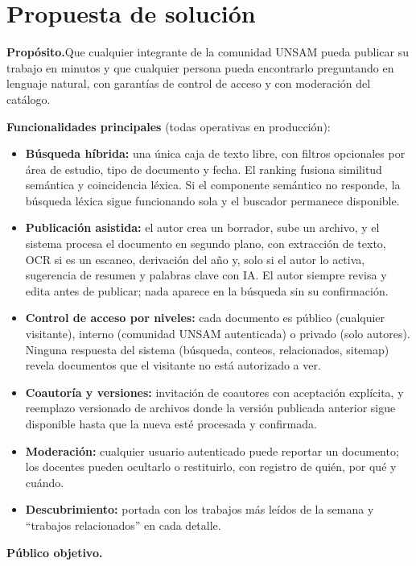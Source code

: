 \documentclass[12pt,a4paper]{article}
\begin{document}
\section{Propuesta de solución}

\noindent\textbf{Propósito.}\enspace Que cualquier integrante de la comunidad UNSAM pueda publicar su trabajo en minutos y que cualquier persona pueda encontrarlo preguntando en lenguaje natural, con garantías de control de acceso y con moderación del catálogo.

\medskip
\noindent\textbf{Funcionalidades principales} (todas operativas en producción):

\begin{itemize}
  \item \textbf{Búsqueda híbrida:} una única caja de texto libre, con filtros opcionales por área de estudio, tipo de documento y fecha. El ranking fusiona similitud semántica y coincidencia léxica. Si el componente semántico no responde, la búsqueda léxica sigue funcionando sola y el buscador permanece disponible.
  \item \textbf{Publicación asistida:} el autor crea un borrador, sube un archivo, y el sistema procesa el documento en segundo plano, con extracción de texto, OCR si es un escaneo, derivación del año y, solo si el autor lo activa, sugerencia de resumen y palabras clave con IA. El autor siempre revisa y edita antes de publicar; nada aparece en la búsqueda sin su confirmación.
  \item \textbf{Control de acceso por niveles:} cada documento es público (cualquier visitante), interno (comunidad UNSAM autenticada) o privado (solo autores). Ninguna respuesta del sistema (búsqueda, conteos, relacionados, sitemap) revela documentos que el visitante no está autorizado a ver.
  \item \textbf{Coautoría y versiones:} invitación de coautores con aceptación explícita, y reemplazo versionado de archivos donde la versión publicada anterior sigue disponible hasta que la nueva esté procesada y confirmada.
  \item \textbf{Moderación:} cualquier usuario autenticado puede reportar un documento; los docentes pueden ocultarlo o restituirlo, con registro de quién, por qué y cuándo.
  \item \textbf{Descubrimiento:} portada con los trabajos más leídos de la semana y “trabajos relacionados” en cada detalle.
\end{itemize}

\medskip
\noindent\textbf{Público objetivo.}
\end{document}
